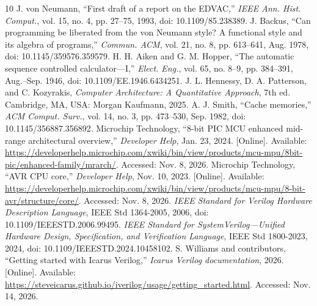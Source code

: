 \documentclass[conference,a4paper]{IEEEtran}
\begin{document}
\begin{thebibliography}{10}
 J. von Neumann, ``First draft of a report on the
EDVAC,'' \textit{IEEE Ann. Hist. Comput.}, vol. 15, no. 4, pp. 27--75,
1993, doi: 10.1109/85.238389.
 J. Backus, ``Can programming be liberated from the von
Neumann style? A functional style and its algebra of programs,''
\textit{Commun. ACM}, vol. 21, no. 8, pp. 613--641, Aug. 1978,
doi: 10.1145/359576.359579.
 H. H. Aiken and G. M. Hopper, ``The automatic sequence
controlled calculator---I,'' \textit{Elect. Eng.}, vol. 65, no. 8--9,
pp. 384--391, Aug.--Sep. 1946, doi: 10.1109/EE.1946.6434251.
 J. L. Hennessy, D. A. Patterson, and C. Kozyrakis,
\textit{Computer Architecture: A Quantitative Approach}, 7th ed.
Cambridge, MA, USA: Morgan Kaufmann, 2025.
 A. J. Smith, ``Cache memories,'' \textit{ACM Comput.
Surv.}, vol. 14, no. 3, pp. 473--530, Sep. 1982,
doi: 10.1145/356887.356892.
 Microchip Technology, ``8-bit PIC MCU enhanced mid-range
architectural overview,'' \textit{Developer Help}, Jan. 23, 2024.
[Online]. Available:
\url{https://developerhelp.microchip.com/xwiki/bin/view/products/mcu-mpu/8bit-pic/enhanced-family/mrarch/}.
Accessed: Nov. 8, 2026.
 Microchip Technology, ``AVR CPU core,'' \textit{Developer
Help}, Nov. 10, 2023. [Online]. Available:
\url{https://developerhelp.microchip.com/xwiki/bin/view/products/mcu-mpu/8-bit-avr/structure/core/}.
Accessed: Nov. 8, 2026.
 \textit{IEEE Standard for Verilog Hardware Description
Language}, IEEE Std 1364-2005, 2006, doi: 10.1109/IEEESTD.2006.99495.
 \textit{IEEE Standard for SystemVerilog---Unified
Hardware Design, Specification, and Verification Language}, IEEE Std
1800-2023, 2024, doi: 10.1109/IEEESTD.2024.10458102.
 S. Williams and contributors, ``Getting started with
Icarus Verilog,'' \textit{Icarus Verilog documentation}, 2026. [Online].
Available:
\url{https://steveicarus.github.io/iverilog/usage/getting_started.html}.
Accessed: Nov. 14, 2026.
\end{thebibliography}
\end{document}
